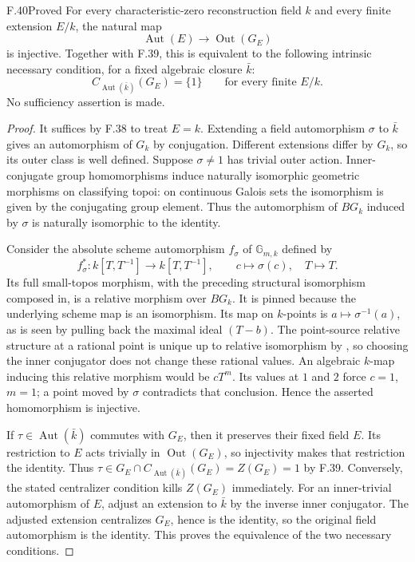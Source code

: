 \begin{claim}{F.40}{Proved}
For every characteristic-zero reconstruction field $k$ and every
finite extension $E/k$, the natural map
\[
 \operatorname{Aut}(E)\longrightarrow\operatorname{Out}(G_E)
\]
is injective. Together with F.39, this is equivalent to the
following intrinsic necessary condition, for a fixed algebraic
closure $\bar k$:
\[
 C_{\operatorname{Aut}(\bar k)}(G_E)=\{1\}
             \qquad\text{for every finite }E/k.
\]
No sufficiency assertion is made.
\end{claim}
\begin{proof}
It suffices by F.38 to treat $E=k$.
Extending a field automorphism $\sigma$ to $\bar k$ gives an
automorphism of $G_k$ by conjugation. Different extensions
differ by $G_k$, so its outer class is well defined.
Suppose $\sigma\ne1$ has trivial outer action. Inner-conjugate
group homomorphisms induce naturally isomorphic geometric
morphisms on classifying topoi: on continuous Galois sets the
isomorphism is given by the conjugating group element.
Thus the automorphism of $BG_k$ induced by $\sigma$ is
naturally isomorphic to the identity.

Consider the absolute scheme automorphism $f_\sigma$ of
$\mathbb G_{m,k}$ defined by
\[
 f_\sigma^*:k[T,T^{-1}]\longrightarrow k[T,T^{-1}],
       \qquad c\longmapsto\sigma(c),\quad T\longmapsto T.
\]
Its full small-topos morphism, with the preceding structural
isomorphism composed in, is a relative morphism over $BG_k$.
It is pinned because the underlying scheme map is an isomorphism.
Its map on $k$-points is $a\mapsto\sigma^{-1}(a)$, as is
seen by pulling back the maximal ideal $(T-b)$.
The point-source relative structure at a rational point is
unique up to relative isomorphism by
\citet[Proposition~3.6]{F_CHW2024}, so choosing the inner
conjugator does not change these rational values.
An algebraic $k$-map inducing this relative morphism would be
$cT^m$. Its values at $1$ and $2$ force $c=1$, $m=1$;
a point moved by $\sigma$ contradicts that conclusion.
Hence the asserted homomorphism is injective.

If $\tau\in\operatorname{Aut}(\bar k)$ commutes with $G_E$,
then it preserves their fixed field $E$. Its restriction to
$E$ acts trivially in $\operatorname{Out}(G_E)$, so injectivity
makes that restriction the identity. Thus
$\tau\in G_E\cap C_{\operatorname{Aut}(\bar k)}(G_E)
=Z(G_E)=1$ by F.39.
Conversely, the stated centralizer condition kills $Z(G_E)$
immediately. For an inner-trivial automorphism of $E$, adjust
an extension to $\bar k$ by the inverse inner conjugator.
The adjusted extension centralizes $G_E$, hence is the identity,
so the original field automorphism is the identity.
This proves the equivalence of the two necessary conditions.
\end{proof}


